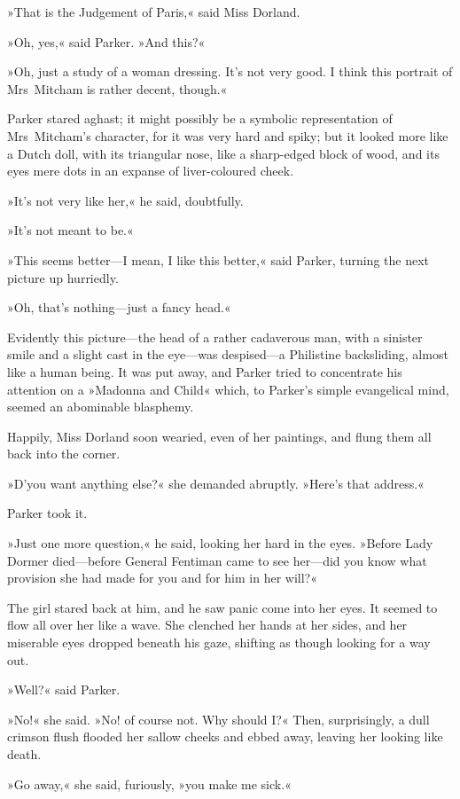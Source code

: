 »That is the Judgement of Paris,« said Miss Dorland.

»Oh, yes,« said Parker. »And this?«

»Oh, just a study of a woman dressing. It's not very good. I think this portrait of Mrs~Mitcham is rather decent, though.«

Parker stared aghast; it might possibly be a symbolic representation of Mrs~Mitcham's character, for it was very hard and spiky; but it looked more like a Dutch doll, with its triangular nose, like a sharp-edged block of wood, and its eyes mere dots in an expanse of liver-coloured cheek.

»It's not very like her,« he said, doubtfully.

»It's not meant to be.«

»This seems better—I mean, I like this better,« said Parker, turning the next picture up hurriedly.

»Oh, that's nothing—just a fancy head.«

Evidently this picture—the head of a rather cadaverous man, with a sinister smile and a slight cast in the eye—was despised—a Philistine backsliding, almost like a human being. It was put away, and Parker tried to concentrate his attention on a »Madonna and Child« which, to Parker's simple evangelical mind, seemed an abominable blasphemy.

Happily, Miss Dorland soon wearied, even of her paintings, and flung them all back into the corner.

»D'you want anything else?« she demanded abruptly. »Here's that address.«

Parker took it.

»Just one more question,« he said, looking her hard in the eyes. »Before Lady Dormer died—before General Fentiman came to see her—did you know what provision she had made for you and for him in her will?«

The girl stared back at him, and he saw panic come into her eyes. It seemed to flow all over her like a wave. She clenched her hands at her sides, and her miserable eyes dropped beneath his gaze, shifting as though looking for a way out.

»Well?« said Parker.

»No!« she said. »No! of course not. Why should I?« Then, surprisingly, a dull crimson flush flooded her sallow cheeks and ebbed away, leaving her looking like death.

»Go away,« she said, furiously, »you make me sick.«